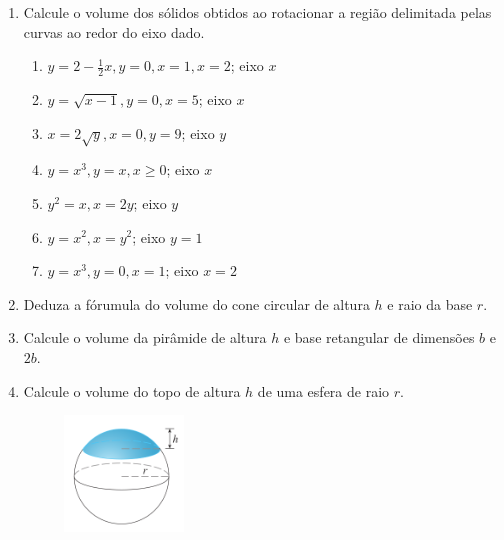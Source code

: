 \documentclass[a4paper,5pt]{amsbook}
\begin{document}
\begin{enumerate}
    \vspace{0.5cm}
    \item Calcule o volume dos s\'olidos obtidos ao rotacionar a regi\~ao delimitada
    pelas curvas ao redor do eixo dado.
        \begin{enumerate}
            \vspace{0.3cm}
            \item $y=2-\frac{1}{2}x, y=0, x=1, x=2$; eixo $x$
            \vspace{0.3cm}
            \item $y=\sqrt{x-1}, y=0, x=5$; eixo $x$
            \vspace{0.3cm}
            \item $x=2\sqrt{y}, x=0, y=9$; eixo $y$
            \vspace{0.3cm}
            \item $y=x^3, y=x, x\geq 0$; eixo $x$
            \vspace{0.3cm}
            \item $y^2=x, x=2y$; eixo $y$
            \vspace{0.3cm}
            \item $y=x^2, x=y^2$; eixo $y=1$
            \vspace{0.3cm}
            \item $y=x^3, y=0, x=1$; eixo $x=2$
        \end{enumerate}

    \vspace{0.5cm}
    \item Deduza a f\'orumula do volume do cone circular de altura $h$ e raio da
        base $r$.

    \vspace{0.5cm}
    \item Calcule o volume da pir\^amide de altura $h$ e base retangular de
        dimens\~oes $b$ e $2b$.

    \vspace{0.5cm}
    \item Calcule o volume do topo de altura $h$ de uma esfera de raio $r$.
        \begin{figure}[h]
            \includegraphics[width=0.3\textwidth]{lista-03-fig2.png}
        \end{figure}
\end{enumerate}
\end{document}

